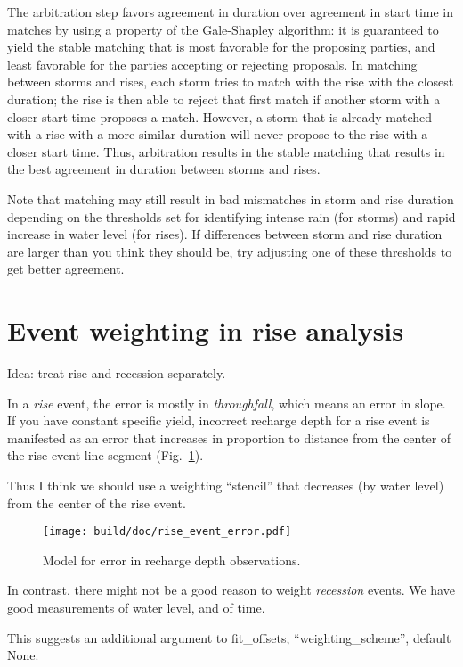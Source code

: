 \documentclass[11pt,a4paper]{article}
\begin{document}
The arbitration step favors agreement in duration over agreement in
start time in matches by using a property of the Gale-Shapley
algorithm: it is guaranteed to yield the stable matching that is most
favorable for the proposing parties, and least favorable for the
parties accepting or rejecting proposals.  In matching between storms
and rises, each storm tries to match with the rise with the closest
duration; the rise is then able to reject that first match if another
storm with a closer start time proposes a match.  However, a storm
that is already matched with a rise with a more similar duration will
never propose to the rise with a closer start time.  Thus, arbitration
results in the stable matching that results in the best agreement in
duration between storms and rises.

Note that matching may still result in bad mismatches in storm and
rise duration depending on the thresholds set for identifying intense
rain (for storms) and rapid increase in water level (for rises).  If
differences between storm and rise duration are larger than you think
they should be, try adjusting one of these thresholds to get better
agreement.

\section{Event weighting in rise analysis}
\label{b:storm_matching}

Idea: treat rise and recession separately.

In a \emph{rise} event, the error is mostly in \emph{throughfall},
which means an error in slope.  If you have constant specific yield,
incorrect recharge depth for a rise event is manifested as an error
that increases in proportion to distance from the center of the rise
event line segment (Fig.~\ref{fig:rise_event_error}).

Thus I think we should use a weighting ``stencil'' that decreases (by
water level) from the center of the rise event.

\begin{figure}[t!]
  \centerline{\texttt{[image: build/doc/rise\_event\_error.pdf]}}
  \caption{Model for error in recharge depth observations.}
  \label{fig:rise_event_error}
\end{figure}

In contrast, there might not be a good reason to weight
\emph{recession} events.  We have good measurements of water level,
and of time.

This suggests an additional argument to fit\_offsets,
``weighting\_scheme'', default None.
\end{document}
